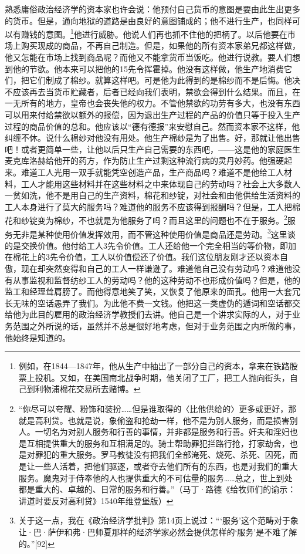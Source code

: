 \documentclass{ctexbook}
\begin{document}
    熟悉庸俗政治经济学的资本家也许会说：他预付自己货币的意图是要由此生出更多的货币。但是，通向地狱的道路是由良好的意图铺成的；他不进行生产，也同样可以有赚钱的意图。\footnote{例如，在1844—1847年，他从生产中抽出了一部分自己的资本，拿来在铁路股票上投机。又如，在美国南北战争时期，他关闭了工厂，把工人抛向街头，自己到利物浦棉花交易所去赌博。}他进行威胁。他说人们再也抓不住他的把柄了。以后他要在市场上购买现成的商品，不再自己制造。但是，如果他的所有资本家弟兄都这样做，他又怎能在市场上找到商品呢？而他又不能拿货币当饭吃。他进行说教。要人们想到他的节欲。他本来可以把他的15先令挥霍掉。他没有这样做，他生产地消费它们，把它们制成了棉纱。就算这样吧。可是他为此得到的是棉纱而不是后悔。他决不应该再去当货币贮藏者，后者已经向我们表明，禁欲会得到什么结果。而且，在一无所有的地方，皇帝也会丧失他的权力。不管他禁欲的功劳有多大，也没有东西可以用来付给禁欲以额外的报偿，因为退出生产过程的产品的价值只等于投入生产过程的商品价值的总和。他应该以“德有德报”来安慰自己。然而资本家不这样，他纠缠不休。说什么棉纱对他没有用处。他生产棉纱是为了出售。好，那就让他出售吧！或者更简单一些，让他以后只生产自己需要的东西吧，——这是他的家庭医生麦克库洛赫给他开的药方，作为防止生产过剩这种流行病的灵丹妙药。他强硬起来。难道工人光用一双手就能凭空创造产品，生产商品吗？难道不是他给工人材料，工人才能用这些材料并在这些材料之中来体现自己的劳动吗？社会上大多数人一贫如洗，他不是用自己的生产资料，棉花和纱锭，对社会和由他供给生活资料的工人本身进行了莫大的服务吗？难道他的服务不应该得到报酬吗？但是，工人把棉花和纱锭变为棉纱，不也就是为他服务了吗？而且这里的问题也不在于服务。\footnote{“你尽可以夸耀、粉饰和装扮……但是谁取得的〈比他供给的〉更多或更好，那就是高利贷。也就是说，象偷盗和抢劫一样，他不是为别人服务，而是损害别人。一切名为对别人服务和行善的事情，并非都是服务和行善。奸夫和淫妇也是互相提供重大的服务和互相满足的。骑士帮助罪犯拦路行抢，打家劫舍，也是对罪犯的重大服务。罗马教徒没有把我们全部淹死、烧死、杀死、囚死，而是让一些人活着，把他们驱逐，或者夺去他们所有的东西，也是对我们的重大服务。魔鬼对于侍奉他的人也提供重大的不可估量的服务……总之，世上到处都是重大的、卓越的、日常的服务和行善。”（马丁·路德《给牧师们的谕示：讲道时要反对高利贷》1540年维登堡版）}服务无非是某种使用价值发挥效用，而不管这种使用价值是商品还是劳动。\footnote{关于这一点，我在《政治经济学批判》第14页上说过：“‘服务’这个范畴对于象让·巴·萨伊和弗·巴师夏那样的经济学家必然会提供怎样的‘服务’是不难了解的。”[92]}这里谈的是交换价值。他付给工人3先令价值。工人还给他一个完全相当的等价物，即加在棉花上的3先令价值，工人以价值偿还了价值。我们这位朋友刚才还以资本自傲，现在却突然变得和自己的工人一样谦逊了。难道他自己没有劳动吗？难道他没有从事监视和监督纺纱工人的劳动吗？他的这种劳动不也形成价值吗？但是，他的监工和经理耸肩膀了。而他得意地笑了笑，又恢复了他原来的面孔。他用一大套冗长无味的空话愚弄了我们。为此他不费一文钱。他把这一类虚伪的遁词和空话都交给他为此目的雇用的政治经济学教授们去讲。他自己是一个讲求实际的人，对于业务范围之外所说的话，虽然并不总是很好地考虑，但对于业务范围之内所做的事，他始终是知道的。
    
\end{document}
